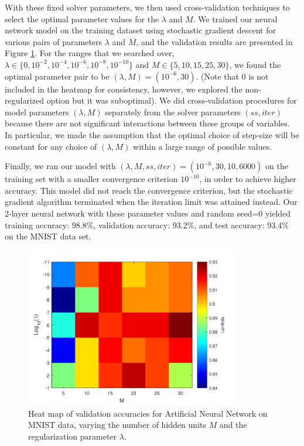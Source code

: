 With these fixed solver parameters, we then used cross-validation techniques to select the optimal parameter values for the $\lambda$ and $M$. We trained our neural network model on the training dataset using stochastic gradient descent for various pairs of parameters $\lambda$ and $M$, and the validation results are presented in Figure \ref{fig:mnist_cv}.  For the ranges that we searched over, $\lambda \in \{0, 10^{-2}, 10^{-4}, 10^{-6}, 10^{-8}, 10^{-10}\}$ and $M \in \{5, 10, 15, 25, 30\}$, we found the optimal parameter pair to be $(\lambda, M) = (10^{-6}, 30)$.  (Note that 0 is not included in the heatmap for consistency, however, we explored the non-regularized option but it was suboptimal).  We did cross-validation procedures for model parameters $(\lambda, M)$ separately from the solver parameters $(ss, iter)$ because there are not significant interactions between these groups of variables.  In particular, we made the assumption that the optimal choice of step-size will be constant for any choice of $(\lambda, M)$ within a large range of possible values.  

Finally, we ran our model with $(\lambda, M, ss, iter) = (10^{-6}, 30, 10, 6000)$ on the training set with a smaller convergence criterion $10^{-10}$, in order to achieve higher accuracy. This model did not reach the convergence criterion, but the stochastic gradient algorithm terminated when the iteration limit was attained instead.  Our 2-layer neural network with these parameter values and random seed=0 yielded training accuracy: 98.8\%, validation accuracy: 93.2\%, and test accuracy: 93.4\% on the MNIST data set.  

\begin{figure}
\centering
	\includegraphics[height=70mm]{mnist_cv.pdf}
    \caption{Heat map of validation accuracies for Artificial Neural Network on MNIST data, varying the number of hidden units $M$ and the regularization parameter $\lambda$.}  \label{fig:mnist_cv}  
\end{figure}
